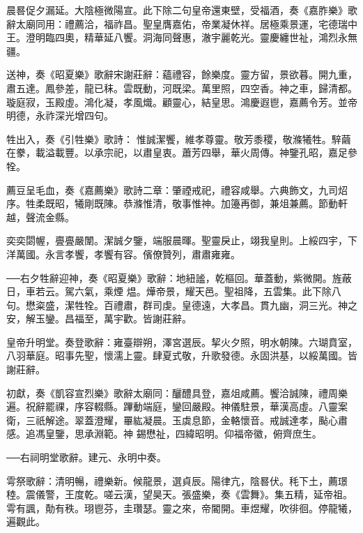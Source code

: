 \begin{pinyinscope}
 晨晷促夕漏延。大陰極微陽宣。此下除二句皇帝還東壁，受福酒，奏《嘉胙樂》歌辭太廟同用：禮薦洽，福祚昌。聖皇膺嘉佑，帝業凝休祥。居極乘景運，宅德瑞中王。澄明臨四奧，精華延八饗。洞海同聲惠，澈宇麗乾光。靈慶纏世祉，鴻烈永無疆。



 送神，奏《昭夏樂》歌辭宋謝莊辭：蘊禮容，餘樂度。靈方留，景欲暮。開九重，肅五達。鳳參差，龍已秣。雲既動，河既梁。萬里照，四空香。神之車，歸清都。璇庭寂，玉殿虛。鴻化凝，孝風熾。顧靈心，結皇思。鴻慶遐鬯，嘉薦令芳。並帝明德，永祚深光增四句。



 牲出入，奏《引牲樂》歌詩：
 惟誠潔饗，維孝尊靈。敬芳黍稷，敬滌犧牲。騂繭在豢，載溢載豐。以承宗祀，以肅皇衷。蕭芳四舉，華火周傳。神鑒孔昭，嘉足參牷。



 薦豆呈毛血，奏《嘉薦樂》歌詩二章：肇禋戒祀，禮容咸舉。六典飾文，九司炤序。牲柔既昭，犧剛既陳。恭滌惟清，敬事惟神。加籩再御，兼俎兼薦。節動軒越，聲流金縣。



 奕奕閟幄，亹亹嚴闈。潔誠夕鑒，端服晨暉。聖靈戾止，翊我皇則。上綏四宇，下洋萬國。永言孝饗，孝饗有容。儐僚贊列，肅肅雍雍。



 ──右夕牲辭迎神，奏《昭夏樂》歌辭：地紐謐，乾樞回。華蓋動，紫微開。旌蔽日，車若云。駕六氣，乘煙
 煴。燁帝景，耀天邑。聖祖降，五雲集。此下除八句。懋粢盛，潔牲牷。百禮肅，群司虔。皇德遠，大孝昌。貫九幽，洞三光。神之安，解玉鑾。昌福至，萬宇歡。皆謝莊辭。



 皇帝升明堂。奏登歌辭：雍臺辯朔，澤宮選辰。挈火夕照，明水朝陳。六瑚賁室，八羽華庭。昭事先聖，懷濡上靈。肆夏式敬，升歌發德。永固洪基，以綏萬國。皆謝莊辭。



 初獻，奏《凱容宣烈樂》歌辭太廟同：釃醴具登，嘉俎咸薦。饗洽誠陳，禮周樂遍。祝辭罷祼，序容輟縣。蹕動端庭，鑾回嚴殿。神儀駐景，華漢高虛。八靈案衛，三祇解途。翠蓋澄耀，罼紘凝晨。玉虡息節，金輅懷音。戒誠達孝，颭心肅感。追馮皇鑒，思承淵範。神
 錫懋祉，四緯昭明。仰福帝徽，俯齊庶生。



 ──右祠明堂歌辭。建元、永明中奏。



 雩祭歌辭：清明暢，禮樂新。候龍景，選貞辰。陽律亢，陰晷伏。秏下土，薦璟稑。震儀警，王度乾。嗟云漢，望昊天。張盛樂，奏《雲舞》。集五精，延帝祖。雩有諷，勣有秩。珝鬯芬，圭瓚瑟。靈之來，帝閽開。車煜耀，吹徘徊。停龍犧，遍觀此。




\end{pinyinscope}
